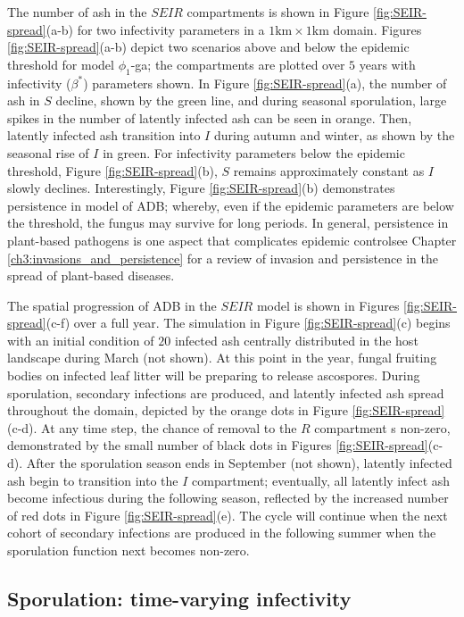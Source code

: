 The number of ash in the $SEIR$ compartments is shown in Figure \ref{fig:SEIR-spread}(a-b) for two infectivity parameters in a $1\mathrm{km}\times1\mathrm{km}$ domain.
Figures \ref{fig:SEIR-spread}(a-b) depict two scenarios above and below the epidemic threshold for model $\phi_1$-ga;
the compartments are plotted over $5$ years with infectivity ($\beta^*$) parameters shown. 
In Figure \ref{fig:SEIR-spread}(a), the number of ash in $S$ decline, shown by the green line,
and during seasonal sporulation, large spikes in the number of latently infected ash can be seen in orange. 
Then, latently infected ash transition into $I$ during autumn and winter, as shown by the seasonal rise of $I$ in green.
For infectivity parameters below the epidemic threshold, Figure \ref{fig:SEIR-spread}(b), $S$ remains approximately constant as $I$ slowly declines. 
Interestingly, Figure \ref{fig:SEIR-spread}(b) demonstrates persistence in model of ADB; 
whereby, even if the epidemic parameters are below the threshold, the fungus may survive for long periods. 
In general, persistence in plant-based pathogens is one aspect that complicates epidemic control\textemdash see Chapter \ref{ch3:invasions_and_persistence} for a review of invasion and persistence in the spread of plant-based diseases.

The spatial progression of ADB in the $SEIR$ model is shown in Figures \ref{fig:SEIR-spread}(c-f) over a full year. 
The simulation in Figure \ref{fig:SEIR-spread}(c) begins with an initial condition of $20$ infected ash centrally distributed in the host landscape during March (not shown). 
At this point in the year, fungal fruiting bodies on infected leaf litter will be preparing to release ascospores.
During sporulation, secondary infections are produced, and latently infected ash spread throughout the domain, depicted by the orange dots in Figure \ref{fig:SEIR-spread}(c-d). 
At any time step, the chance of removal to the $R$ compartment s non-zero, demonstrated by the small number of black dots in Figures \ref{fig:SEIR-spread}(c-d).
After the sporulation season ends in September (not shown), latently infected ash begin to transition into the $I$ compartment;
eventually, all latently infect ash become infectious during the following season, reflected by the increased number of red dots in Figure \ref{fig:SEIR-spread}(e). 
The cycle will continue when the next cohort of secondary infections are produced in the following summer when the sporulation function next becomes non-zero.

\subsection{Sporulation: time-varying infectivity}
\label{ch6:sporulation}

